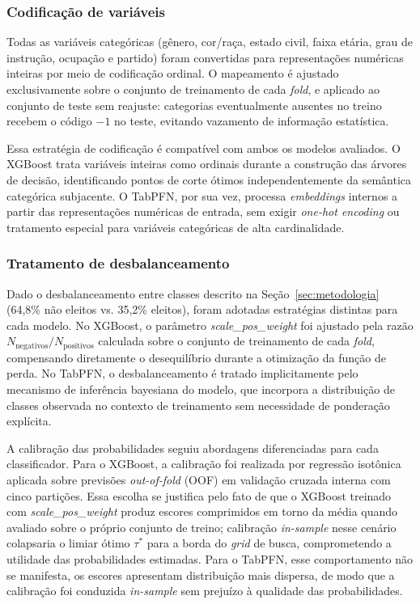 \documentclass[12pt]{article}
\begin{document}
\subsubsection{Codificação de variáveis}

Todas as variáveis categóricas (gênero, cor/raça, estado civil, faixa etária, grau de instrução, ocupação e partido) foram convertidas para representações numéricas inteiras por meio de codificação ordinal. O mapeamento é ajustado exclusivamente sobre o conjunto de treinamento de cada \textit{fold}, e aplicado ao conjunto de teste sem reajuste: categorias eventualmente ausentes no treino recebem o código $-1$ no teste, evitando vazamento de informação estatística.

Essa estratégia de codificação é compatível com ambos os modelos avaliados. O XGBoost trata variáveis inteiras como ordinais durante a construção das árvores de decisão, identificando pontos de corte ótimos independentemente da semântica categórica subjacente. O TabPFN, por sua vez, processa \textit{embeddings} internos a partir das representações numéricas de entrada, sem exigir \textit{one-hot encoding} ou tratamento especial para variáveis categóricas de alta cardinalidade.

\subsubsection{Tratamento de desbalanceamento}

Dado o desbalanceamento entre classes descrito na Seção~\ref{sec:metodologia} (64,8\% não eleitos vs. 35,2\% eleitos), foram adotadas estratégias distintas para cada modelo. No XGBoost, o parâmetro \textit{scale\_pos\_weight} foi ajustado pela razão $N_{\text{negativos}} / N_{\text{positivos}}$ calculada sobre o conjunto de treinamento de cada \textit{fold}, compensando diretamente o desequilíbrio durante a otimização da função de perda. No TabPFN, o desbalanceamento é tratado implicitamente pelo mecanismo de inferência bayesiana do modelo, que incorpora a distribuição de classes observada no contexto de treinamento sem necessidade de ponderação explícita.

A calibração das probabilidades seguiu abordagens diferenciadas para cada classificador. Para o XGBoost, a calibração foi realizada por regressão isotônica aplicada sobre previsões \textit{out-of-fold} (OOF) em validação cruzada interna com cinco partições. Essa escolha se justifica pelo fato de que o XGBoost treinado com \textit{scale\_pos\_weight} produz escores comprimidos em torno da média quando avaliado sobre o próprio conjunto de treino; calibração \textit{in-sample} nesse cenário colapsaria o limiar ótimo $\tau^*$ para a borda do \textit{grid} de busca, comprometendo a utilidade das probabilidades estimadas. Para o TabPFN, esse comportamento não se manifesta, os escores apresentam distribuição mais dispersa, de modo que a calibração foi conduzida \textit{in-sample} sem prejuízo à qualidade das probabilidades.
\end{document}
